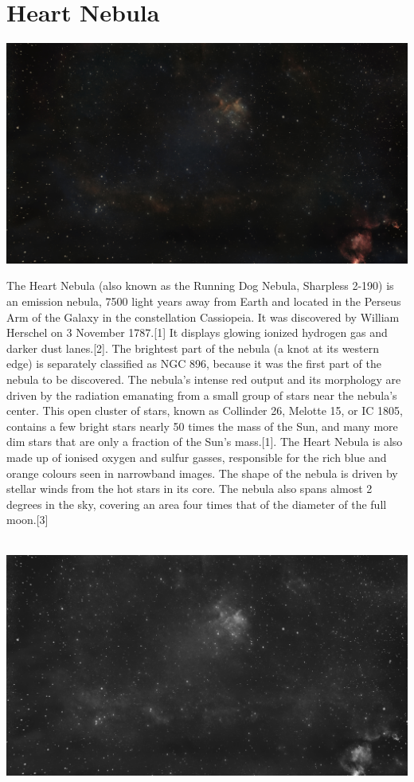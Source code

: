 \ \\\section{Heart Nebula}
\includegraphics[width=\textwidth]{../Imaging//Original/Heart_Nebula.jpg}
{\footnotesize\color{white}
The Heart Nebula (also known as the Running Dog Nebula, Sharpless 2-190) is an emission nebula, 7500 light years away from Earth and located in the Perseus Arm of the Galaxy in the constellation Cassiopeia. It was discovered by William Herschel on 3 November 1787.[1] It displays glowing ionized hydrogen gas and darker dust lanes.[2]. The brightest part of the nebula (a knot at its western edge) is separately classified as NGC 896, because it was the first part of the nebula to be discovered. The nebula's intense red output and its morphology are driven by the radiation emanating from a small group of stars near the nebula's center. This open cluster of stars, known as Collinder 26, Melotte 15, or IC 1805, contains a few bright stars nearly 50 times the mass of the Sun, and many more dim stars that are only a fraction of the Sun's mass.[1]. The Heart Nebula is also made up of ionised oxygen and sulfur gasses, responsible for the rich blue and orange colours seen in narrowband images. The shape of the nebula is driven by stellar winds from the hot stars in its core. The nebula also spans almost 2 degrees in the sky, covering an area four times that of the diameter of the full moon.[3]


}\ \\
\includegraphics[width=\textwidth]{../Imaging//Grayscale/Heart_Nebula.jpg}
